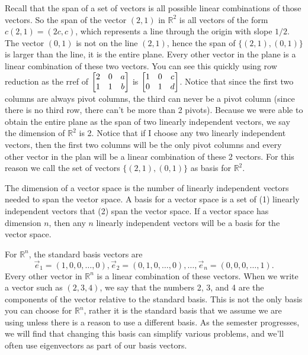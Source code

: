 \begin{example}
Recall that the span of a set of vectors is all possible linear combinations of those vectors.  So the span of the vector $(2,1)$ in $\mathbb{R}^2$ is all vectors of the form $c(2,1)=(2c,c)$, which represents a line through the origin with slope $1/2$. The vector $(0,1)$ is not on the line $(2,1)$, hence the span of $\{(2,1),(0,1)\}$ is larger than the line, it is the entire plane. Every other vector in the plane is a linear combination of these two vectors. You can see this quickly using row reduction as the rref of 
$
\begin{bmatrix}
\begin{matrix} 2\\1 \end{matrix}&
\begin{matrix} 0\\1 \end{matrix}&
\begin{matrix} a\\b \end{matrix}
\end{bmatrix}
$
is 
$
\begin{bmatrix}
\begin{matrix} 1\\0 \end{matrix}&
\begin{matrix} 0\\1 \end{matrix}&
\begin{matrix} c\\d \end{matrix}
\end{bmatrix}
$.
Notice that since the first two columns are always pivot columns, the third can never be a pivot column (since there is no third row, there can't be more than 2 pivots). Because we were able to obtain the entire plane as the span of two linearly independent vectors, we say the dimension of $\mathbb{R}^2$ is 2. Notice that if I choose any two linearly independent vectors, then the first two columns will be the only pivot columns and every other vector in the plan will be a linear combination of these 2 vectors. For this reason we call the set of vectors $\{(2,1),(0,1)\}$ as basis for $\mathbb{R}^2$.
\end{example}

The dimension of a vector space is the number of linearly independent vectors needed to span the vector space.  A basis for a vector space is a set of (1) linearly independent vectors that (2) span the vector space.  If a vector space has dimension $n$, then any $n$ linearly independent vectors will be a basis for the vector space. 

For $\mathbb{R}^n$, the standard basis vectors are $$\vec e_1=(1,0,0,\ldots,0), \vec e_2=(0,1,0,\ldots,0),\ldots,\vec e_n=(0,0,0,\ldots,1).$$ 
Every other vector in $\mathbb{R}^n$ is a linear combination of these vectors.  
When we write a vector such as $(2,3,4)$, we say that the numbers 2, 3, and 4 are the components of the vector relative to the standard basis.  
This is not the only basis you can choose for $\mathbb{R}^n$, rather it is the standard basis that we assume we are using unless there is a reason to use a different basis.  
As the semester progresses, we will find that changing this basis can simplify various problems, and we'll often use eigenvectors as part of our basis vectors.    



